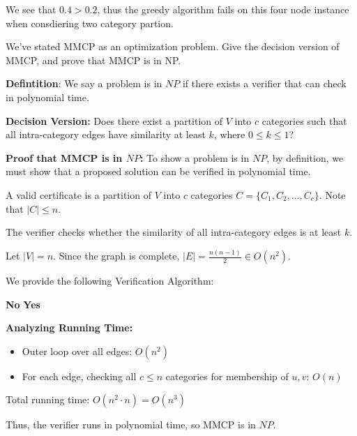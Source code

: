 \begin{questions}
\begin{soln}
		We see that \(0.4 > 0.2\), thus the greedy algorithm fails on this four node instance when consdiering two category partion.
	\end{soln}

	\question[2] We've stated MMCP as an optimization problem. Give the decision version of MMCP, and prove that MMCP is in NP.

	\begin{soln}
		\textbf{Defintition}: We say a problem is in \(NP\) if there exists a verifier that can check in polynomial time.

		\textbf{Decision Version:}
		Does there exist a partition of \(V\) into \(c\) categories such that all intra-category edges have similarity at least \(k\), where \(0 \leq k \leq 1\)?

		\textbf{Proof that MMCP is in \(NP\):}
		To show a problem is in \(NP\), by definition, we must show that a proposed solution can be verified in polynomial time.

		A valid certificate is a partition of \(V\) into \(c\) categories \(C = \{C_1, C_2, \dots, C_c\}\). Note that \(|C| \leq n\).

		The verifier checks whether the similarity of all intra-category edges is at least \(k\).

		Let \(|V| = n\). Since the graph is complete, \(|E| = \frac{n(n-1)}{2} \in O(n^2)\).

		We provide the following Verification Algorithm:

		\begin{algorithmic}[1]
			\State \Return \textbf{No}
			\EndIf
			\EndIf
			\EndFor
			\EndFor
			\State \Return \textbf{Yes}
			\EndProcedure
		\end{algorithmic}

		\textbf{Analyzing Running Time:}
		\begin{itemize}
			\item Outer loop over all edges: \(O(n^2)\)
			\item For each edge, checking all \(c \leq n\) categories for membership of \(u, v\): \(O(n)\)
		\end{itemize}
		Total running time: \(O(n^2 \cdot n) = O(n^3)\)

		Thus, the verifier runs in polynomial time, so MMCP is in \(NP\).




	\end{soln}


\end{questions}
